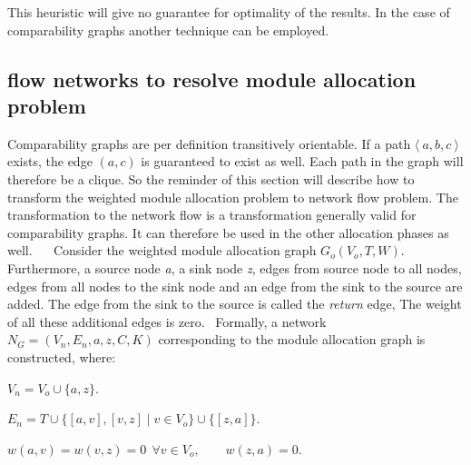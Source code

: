 This heuristic will give no guarantee for optimality of the results. In the case of comparability graphs another technique can be employed.\hypertarget{src_HLS_module_binding_page_flow_net}{}\subsection{flow networks to resolve module allocation problem}\label{src_HLS_module_binding_page_flow_net}
Comparability graphs are per definition transitively orientable. If a path $ \langle \ a,b,c\ \rangle $ exists, the edge $ (a,c) $ is guaranteed to exist as well. Each path in the graph will therefore be a clique. So the reminder of this section will describe how to transform the weighted module allocation problem to network flow problem. The transformation to the network flow is a transformation generally valid for comparability graphs. It can therefore be used in the other allocation phases as well.~\newline
~\newline
 Consider the weighted module allocation graph $ G_{o}(V_{o},T,W) $. Furthermore, a source node {\itshape a}, a sink node {\itshape z}, edges from source node to all nodes, edges from all nodes to the sink node and an edge from the sink to the source are added. The edge from the sink to the source is called the {\itshape return} edge, The weight of all these additional edges is zero.~\newline
 Formally, a network $ N_{G}=(V_n,E_n,a,z,C,K) $ corresponding to the module allocation graph is constructed, where\+:~\newline

\begin{DoxyItemize}
\item $ V_n=V_o \cup \lbrace a,z \rbrace $.
\item $ E_n=T \cup \lbrace [a,v],[v,z] \mid v \in V_o \rbrace \cup \lbrace [z,a] \rbrace $.
\item $ w(a,v)=w(v,z)=0\ \ \forall v \in V_o,\ \ \ \ \ \ \ \ \ w(z,a)=0 $.
\end{DoxyItemize}

